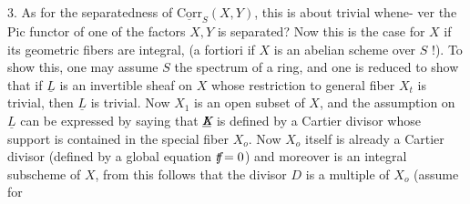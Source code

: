 3. As for the separatedness of $\underline{\mathrm{Corr}}_{S}(X,Y)$, this is about trivial whene-
ver the Pic functor of one of the factors $X,Y$ is separated? Now this is  the case  for $X$ if its geometric fibers are integral, (a fortiori if $X$ is an abelian scheme over $S$ !). To show this, one may assume $S$ the spectrum of a  ring, and one is reduced to show that if $\underline{L}$ is an invertible sheaf on $X$ whose restriction to  general fiber $X_{t}$ is trivial, then $\underline{L}$ is trivial. Now $X_{1}$ is an open subset of $X$, and the assumption on $\underline{L}$ can be expressed by saying that $\underline{\mathord{\rlap{$X$}L}}$ is defined by a Cartier divisor whose support is contained in the special fiber $X_{o}$. Now $X_{o}$ itself is already a Cartier divisor (defined by a global equation $\mathord{\rlap{$f$}t}=0$) and moreover is an integral subscheme of $X$, from this follows that the divisor $D$ is a multiple of $X_{o}$ (assume for
